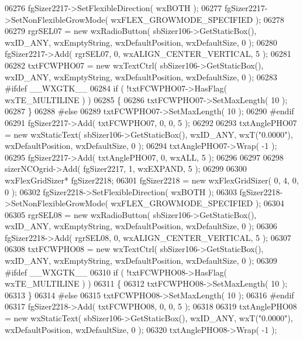 \begin{DoxyCode}
06276     fgSizer2217->SetFlexibleDirection( wxBOTH );
06277     fgSizer2217->SetNonFlexibleGrowMode( wxFLEX\_GROWMODE\_SPECIFIED );
06278     
06279     rgrSEL07 = \textcolor{keyword}{new} wxRadioButton( sbSizer106->GetStaticBox(), wxID\_ANY, wxEmptyString, wxDefaultPosition, 
      wxDefaultSize, 0 );
06280     fgSizer2217->Add( rgrSEL07, 0, wxALIGN\_CENTER\_VERTICAL, 5 );
06281     
06282     txtFCWPHO07 = \textcolor{keyword}{new} wxTextCtrl( sbSizer106->GetStaticBox(), wxID\_ANY, wxEmptyString, wxDefaultPosition, 
      wxDefaultSize, 0 );
06283 \textcolor{preprocessor}{    #ifdef \_\_WXGTK\_\_}
06284     \textcolor{keywordflow}{if} ( !txtFCWPHO07->HasFlag( wxTE\_MULTILINE ) )
06285     \{
06286     txtFCWPHO07->SetMaxLength( 10 );
06287     \}
06288 \textcolor{preprocessor}{    #else}
06289     txtFCWPHO07->SetMaxLength( 10 );
06290 \textcolor{preprocessor}{    #endif}
06291     fgSizer2217->Add( txtFCWPHO07, 0, 0, 5 );
06292     
06293     txtAnglePHO07 = \textcolor{keyword}{new} wxStaticText( sbSizer106->GetStaticBox(), wxID\_ANY, wxT(\textcolor{stringliteral}{"0.0000"}), 
      wxDefaultPosition, wxDefaultSize, 0 );
06294     txtAnglePHO07->Wrap( -1 );
06295     fgSizer2217->Add( txtAnglePHO07, 0, wxALL, 5 );
06296     
06297     
06298     sizerNCOgrid->Add( fgSizer2217, 1, wxEXPAND, 5 );
06299     
06300     wxFlexGridSizer* fgSizer2218;
06301     fgSizer2218 = \textcolor{keyword}{new} wxFlexGridSizer( 0, 4, 0, 0 );
06302     fgSizer2218->SetFlexibleDirection( wxBOTH );
06303     fgSizer2218->SetNonFlexibleGrowMode( wxFLEX\_GROWMODE\_SPECIFIED );
06304     
06305     rgrSEL08 = \textcolor{keyword}{new} wxRadioButton( sbSizer106->GetStaticBox(), wxID\_ANY, wxEmptyString, wxDefaultPosition, 
      wxDefaultSize, 0 );
06306     fgSizer2218->Add( rgrSEL08, 0, wxALIGN\_CENTER\_VERTICAL, 5 );
06307     
06308     txtFCWPHO08 = \textcolor{keyword}{new} wxTextCtrl( sbSizer106->GetStaticBox(), wxID\_ANY, wxEmptyString, wxDefaultPosition, 
      wxDefaultSize, 0 );
06309 \textcolor{preprocessor}{    #ifdef \_\_WXGTK\_\_}
06310     \textcolor{keywordflow}{if} ( !txtFCWPHO08->HasFlag( wxTE\_MULTILINE ) )
06311     \{
06312     txtFCWPHO08->SetMaxLength( 10 );
06313     \}
06314 \textcolor{preprocessor}{    #else}
06315     txtFCWPHO08->SetMaxLength( 10 );
06316 \textcolor{preprocessor}{    #endif}
06317     fgSizer2218->Add( txtFCWPHO08, 0, 0, 5 );
06318     
06319     txtAnglePHO08 = \textcolor{keyword}{new} wxStaticText( sbSizer106->GetStaticBox(), wxID\_ANY, wxT(\textcolor{stringliteral}{"0.0000"}), 
      wxDefaultPosition, wxDefaultSize, 0 );
06320     txtAnglePHO08->Wrap( -1 );

\end{DoxyCode}
